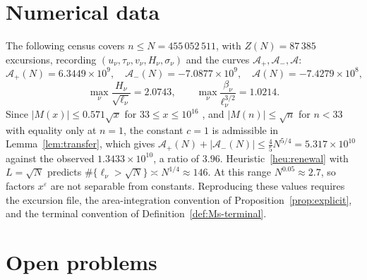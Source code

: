 \documentclass[11pt]{amsart}
\numberwithin{equation}{section}
\theoremstyle{plain}
\theoremstyle{definition}
\theoremstyle{remark}
\newcommand{\Ap}{\mathcal{A}_{+}}
\newcommand{\Am}{\mathcal{A}_{-}}
\newcommand{\Anet}{\mathcal{A}}
\newcommand{\eps}{\varepsilon}
\begin{document}
\section{Numerical data}
\label{sec:data}

The following census covers $n\le N=455\,052\,511$, with $Z(N)=87\,385$
excursions, recording $(u_\nu,\tau_\nu,v_\nu,H_\nu,\sigma_\nu)$ and the
curves $\Ap,\Am,\Anet$:
\begin{equation}
\label{eq:census_values}
  \Ap(N)=6.3449\times10^9,\quad \Am(N)=-7.0877\times10^9,\quad
  \Anet(N)=-7.4279\times10^8,
\end{equation}
\begin{equation}
\label{eq:census_max}
  \max_\nu\frac{H_\nu}{\sqrt{\ell_\nu}}=2.0743,\qquad
  \max_\nu\frac{\beta_\nu}{\ell_\nu^{3/2}}=1.0214 .
\end{equation}
Since $|M(x)|\le0.571\sqrt x$ for $33\le x\le10^{16}$ \cite{Hurst18}, and
$|M(n)|\le\sqrt n$ for $n<33$ with equality only at $n=1$, the
constant $c=1$ is admissible in Lemma~\ref{lem:transfer}, which gives
$\Ap(N)+|\Am(N)|\le\frac45N^{5/4}=5.317\times10^{10}$ against the observed
$1.3433\times10^{10}$, a ratio of $3.96$. Heuristic~\ref{heu:renewal} with
$L=\sqrt N$ predicts $\#\{\ell_\nu>\sqrt N\}\asymp N^{1/4}\approx146$. At
this range $N^{0.05}\approx2.7$, so factors $x^\eps$ are not separable from
constants. Reproducing these values requires the excursion file, the
area-integration convention of Proposition~\ref{prop:explicit}, and the
terminal convention of Definition~\ref{def:Ms-terminal}.

\section{Open problems}
\label{sec:open_questions}
\end{document}
